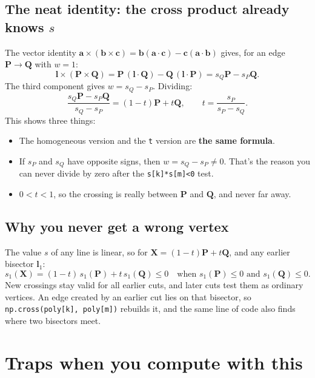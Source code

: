 \documentclass[11pt,a4paper]{article}
\newcommand{\vect}[1]{\mathbf{#1}}
\newcommand{\vP}{\vect{P}}
\newcommand{\vQ}{\vect{Q}}
\newcommand{\vl}{\vect{l}}
\newcommand{\vX}{\vect{X}}
\begin{document}
\subsection*{The neat identity: the cross product already knows $s$}
The vector identity $\vect{a}\times(\vect{b}\times\vect{c})=\vect{b}(\vect{a}\cdot\vect{c})-\vect{c}(\vect{a}\cdot\vect{b})$ gives, for an edge $\vP\to\vQ$ with $w=1$:
\[
\vl\times(\vP\times\vQ)=\vP\,(\vl\cdot\vQ)-\vQ\,(\vl\cdot\vP)=s_Q\vP-s_P\vQ .
\]
The third component gives $w=s_Q-s_P$. Dividing:
\[
\frac{s_Q\vP-s_P\vQ}{s_Q-s_P}=(1-t)\vP+t\vQ,\qquad t=\frac{s_P}{s_P-s_Q}.
\]
This shows three things:
\begin{itemize}
\item The homogeneous version and the \texttt{t} version are \textbf{the same formula}.
\item If $s_P$ and $s_Q$ have opposite signs, then $w=s_Q-s_P\ne0$. That's the reason you can never divide by zero after the
\texttt{s[k]*s[m]<0} test.
\item $0<t<1$, so the crossing is really between $\vP$ and $\vQ$, and never far away.
\end{itemize}

\subsection*{Why you never get a wrong vertex}
The value $s$ of any line is linear, so for $\vX=(1-t)\vP+t\vQ$, and any earlier bisector $\vl_1$:
\[
s_1(\vX)=(1-t)\,s_1(\vP)+t\,s_1(\vQ)\le 0
\quad\text{when } s_1(\vP)\le0 \text{ and } s_1(\vQ)\le0 .
\]
New crossings stay valid for all earlier cuts, and later cuts test them as ordinary vertices. An edge created by an earlier cut
lies on that bisector, so \texttt{np.cross(poly[k], poly[m])} rebuilds it, and the same line of code also finds where two
bisectors meet.

\section{Traps when you compute with this}
\end{document}
